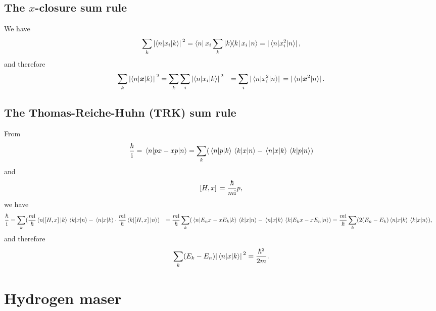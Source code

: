 \documentclass[hyperref, a4paper]{article}
\newcommand*{\ii}{\mathrm{i}}
\def\\{}%
\begin{document}
\subsection{The $x$-closure sum rule}

We have
\begin{equation}
    \sum_{k} \abs*{\mel**{n}{x_i}{k}}^2 = \bra{n} x_i \sum_k \dyad{k} x_i \ket*{n} = \abs*{\expval*{x_i^2}{n}},
\end{equation}
and therefore 
\begin{equation}
    \begin{aligned}
        \sum_{k} \abs*{\mel**{n}{\vb*{x}}{k}}^2 &=
        \sum_k \sum_i  \abs*{\mel**{n}{x_i}{k}}^2 \\
        &= \sum_i \abs*{\expval*{x_i^2}{n}} = \abs*{\expval*{\vb*{x}^2}{n}}.
    \end{aligned}
\end{equation}

\subsection{The Thomas-Reiche-Huhn (TRK) sum rule}

From 
\begin{equation}
    \frac{\hbar}{\ii} = \expval*{px - xp}{n} 
    = \sum_k (
        \mel{n}{p}{k} \mel{k}{x}{n}
        - \mel{n}{x}{k} \mel{k}{p}{n}
    )
\end{equation}
and 
\begin{equation}
    \comm*{H}{x} = \frac{\hbar}{m \ii}p,
\end{equation}
we have 
\[
    \begin{aligned}
        \frac{\hbar}{\ii} &= \sum_k (
            \frac{m \ii}{\hbar} \mel{n}{\comm*{H}{x}}{k} \mel{k}{x}{n}
            - \mel{n}{x}{k} \cdot \frac{m \ii}{\hbar} \mel{k}{\comm*{H}{x}}{n}
        ) \\
        &= \frac{m \ii}{\hbar} \sum_k (
            \mel{n}{E_n x - x E_k}{k} \mel{k}{x}{n}
            - \mel{n}{x}{k} \mel{k}{E_k x - x E_n}{n}
        ) \\
        &= \frac{m \ii}{\hbar} \sum_k (
            2 (E_n - E_k)  \mel{n}{x}{k} \mel{k}{x}{n}
        ) ,
    \end{aligned}
\]
and therefore
\begin{equation}
    \sum_k (E_k - E_n) \abs*{\mel{n}{x}{k}}^2 = \frac{\hbar^2}{2m}.
\end{equation}

\section{Hydrogen maser}
\end{document}
